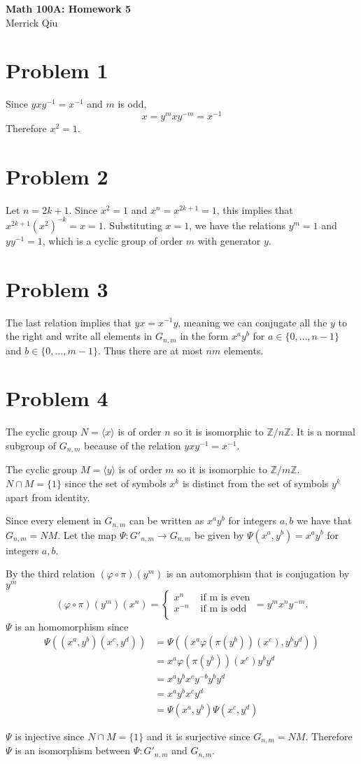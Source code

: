 \documentclass{article}
\begin{document}
\begin{center}
	\huge{\bf Math 100A: Homework 5} \\
	Merrick Qiu
\end{center}

\section*{Problem 1}
Since $yxy^{-1} = x^{-1}$ and $m$ is odd,
\[
	x = y^m x y^{-m} = x^{-1}
\]
Therefore $x^2 = 1$.
\newpage 

\section*{Problem 2}
Let $n = 2k+1$.
Since $x^2 = 1$ and $x^n = x^{2k+1} = 1$,
this implies that $x^{2k+1}(x^{2})^{-k} = x = 1$.
Substituting $x=1$, we have the relations $y^m = 1$ and $yy^{-1} = 1$,
which is a cyclic group of order $m$ with generator $y$.
\newpage 

\section*{Problem 3}
The last relation implies that $yx = x^{-1}y$, meaning we can
conjugate all the $y$ to the right and write all elements in $G_{n,m}$
in the form $x^ay^b$ for 
$a \in \{0, \ldots, n-1 \}$ and $b \in \{0, \ldots, m-1 \}$.
Thus there are at most $nm$ elements.
\newpage 

\section*{Problem 4}
The cyclic group $N = \langle x \rangle$ is of order $n$
so it is isomorphic to $\mathbb{Z}/n\mathbb{Z}$.
It is a normal subgroup of $G_{n,m}$ because of the relation $yxy^{-1} = x^{-1}$.

The cyclic group $M = \langle y \rangle$ is of order $m$
so it is isomorphic to $\mathbb{Z}/m\mathbb{Z}$.
$N \cap M = \{1\}$ since the set of symbols $x^k$ is distinct from the set 
of symbols $y^k$ apart from identity.

Since every element in $G_{n,m}$ can be written as $x^ay^b$
for integers $a,b$ we have that $G_{n,m} = NM$.
Let the map $\Psi : G'_{n,m} \to G_{n,m}$ be given by $\Psi(x^a,y^b) = x^ay^b$
for integers $a,b$.

By the third relation $(\varphi \circ \pi)(y^m)$ is an automorphism
that is conjugation by $y^m$
\[
	(\varphi \circ \pi)(y^m)(x^n) = 
	\begin{cases}
		x^n & \text{ if m is even} \\
		x^{-n} & \text{ if m is odd} \\
	\end{cases} = 
	y^m x^n y^{-m}.
\]
$\Psi$ is an homomorphism since
\begin{align*}
	\Psi((x^a, y^b)(x^c, y^d)) &= \Psi((x^a\varphi(\pi(y^b))(x^c), y^by^d))\\
	&=x^a\varphi(\pi(y^b))(x^c) y^by^d \\
	&= x^ay^bx^cy^{-b}y^by^d \\
	&= x^ay^bx^cy^d \\
	&=\Psi(x^a, y^b)\Psi(x^c, y^d)
\end{align*}

$\Psi$ is injective since $N \cap M = \{1\}$
and it is surjective since $G_{n,m} = NM$.
Therefore $\Psi$ is an isomorphism between
$\Psi : G'_{n,m}$ and $G_{n,m}$.
\end{document}
